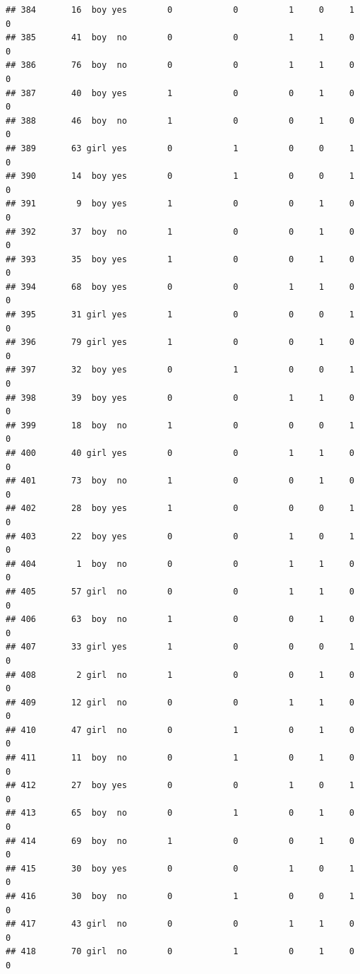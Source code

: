 \documentclass[man]{apa6}
\begin{document}
\begin{verbatim}
## 384       16  boy yes        0            0          1     0     1     0
## 385       41  boy  no        0            0          1     1     0     0
## 386       76  boy  no        0            0          1     1     0     0
## 387       40  boy yes        1            0          0     1     0     0
## 388       46  boy  no        1            0          0     1     0     0
## 389       63 girl yes        0            1          0     0     1     0
## 390       14  boy yes        0            1          0     0     1     0
## 391        9  boy yes        1            0          0     1     0     0
## 392       37  boy  no        1            0          0     1     0     0
## 393       35  boy yes        1            0          0     1     0     0
## 394       68  boy yes        0            0          1     1     0     0
## 395       31 girl yes        1            0          0     0     1     0
## 396       79 girl yes        1            0          0     1     0     0
## 397       32  boy yes        0            1          0     0     1     0
## 398       39  boy yes        0            0          1     1     0     0
## 399       18  boy  no        1            0          0     0     1     0
## 400       40 girl yes        0            0          1     1     0     0
## 401       73  boy  no        1            0          0     1     0     0
## 402       28  boy yes        1            0          0     0     1     0
## 403       22  boy yes        0            0          1     0     1     0
## 404        1  boy  no        0            0          1     1     0     0
## 405       57 girl  no        0            0          1     1     0     0
## 406       63  boy  no        1            0          0     1     0     0
## 407       33 girl yes        1            0          0     0     1     0
## 408        2 girl  no        1            0          0     1     0     0
## 409       12 girl  no        0            0          1     1     0     0
## 410       47 girl  no        0            1          0     1     0     0
## 411       11  boy  no        0            1          0     1     0     0
## 412       27  boy yes        0            0          1     0     1     0
## 413       65  boy  no        0            1          0     1     0     0
## 414       69  boy  no        1            0          0     1     0     0
## 415       30  boy yes        0            0          1     0     1     0
## 416       30  boy  no        0            1          0     0     1     0
## 417       43 girl  no        0            0          1     1     0     0
## 418       70 girl  no        0            1          0     1     0     0

\end{verbatim}
\end{document}

